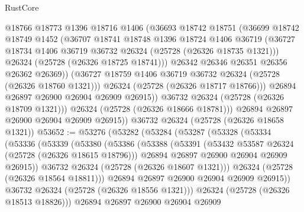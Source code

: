 \begin{lexlean}{RustCore}
\begin{coremodule}
                  @18766
                  @18773
                  @1396
                  @18716
                  @1406
                  (@36693
                    @18742
                    @18751
                    (@36699
                      @18742
                      @18749
                      @1452
                      (@36707
                        @18741
                        @18748
                        @1396
                        @18724
                        @1406
                        @36719
                        (@36727 @18734 @1406 @36719 @36732 @26324 (@25728 (@26326 @18735 @1321)))
                        @26324
                        (@25728 (@26326 @18725 @18741)))
                      @26342
                      @26346
                      @26351
                      @26356
                      @26362
                      @26369))
                  (@36727 @18759 @1406 @36719 @36732 @26324 (@25728 (@26326 @18760 @1321)))
                  @26324
                  (@25728 (@26326 @18717 @18766)))
                @26894
                @26897
                @26900
                @26904
                @26909
                @26915))
            @36732
            @26324
            (@25728 (@26326 @18709 @1321)))
          @26324
          (@25728 (@26326 @18666 @18781)))
        @26894
        @26897
        @26900
        @26904
        @26909
        @26915))
    @36732
    @26324
    (@25728 (@26326 @18658 @1321))
@53652 := @53276
    (@53282
      (@53284
        (@53287
          (@53328
            (@53334
              (@53336
                (@53339
                  (@53380
                    (@53386
                      (@53388
                        (@53391
                          (@53432 @53587 @26324 (@25728 (@26326 @18615 @18796)))
                          @26894
                          @26897
                          @26900
                          @26904
                          @26909
                          @26915))
                      @36732
                      @26324
                      (@25728 (@26326 @18607 @1321)))
                    @26324
                    (@25728 (@26326 @18564 @18811)))
                  @26894
                  @26897
                  @26900
                  @26904
                  @26909
                  @26915))
              @36732
              @26324
              (@25728 (@26326 @18556 @1321)))
            @26324
            (@25728 (@26326 @18513 @18826)))
          @26894
          @26897
          @26900
          @26904
          @26909

\end{coremodule}
\end{lexlean}
